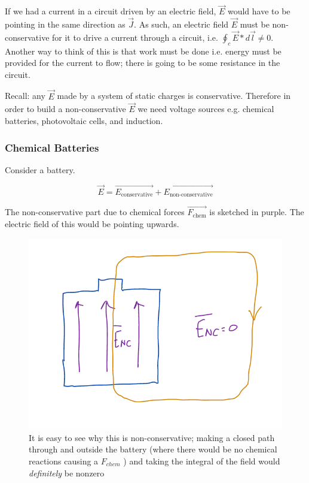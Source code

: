 \documentclass[10pt]{article}
\begin{document}
If we had a current in a circuit driven by an electric field, $ \vec{E} $ would have to be pointing in the same direction as $ \vec{J} $.
As such, an electric field $ \vec{E} $ must be non-conservative for it to drive a current through a circuit, i.e. $ \oint_c \vec{E} * d\vec{l} \neq 0$.
Another way to think of this is that work must be done i.e. energy must be provided for the current to flow; there is going to be some resistance in the circuit.

Recall: any $ \vec{E} $ made by a system of static charges is conservative. 
Therefore in order to build a non-conservative $ \vec{E} $ we need voltage sources e.g. chemical batteries, photovoltaic cells, and induction.



\subsubsection{Chemical Batteries}

Consider a battery.

\begin{equation}
	\vec{E} = \vec{E_{\text{conservative}}} + \vec{E_{\text{non-conservative}}}
\end{equation}

The non-conservative part due to chemical forces $ \vec{F_{\text{chem}}} $ is sketched in purple. 
The electric field of this would be pointing upwards.

\begin{figure}[H]
	\centering
	\includegraphics[width=0.8\linewidth]{img/image_2022-04-17-19-13-56.png}
	\caption{It is easy to see why this is non-conservative; making a closed path through and outside the battery (where there would be no chemical reactions causing a $ F_{chem} $ ) and taking the integral of the field would \textit{definitely} be nonzero}
\end{figure}
\end{document}

